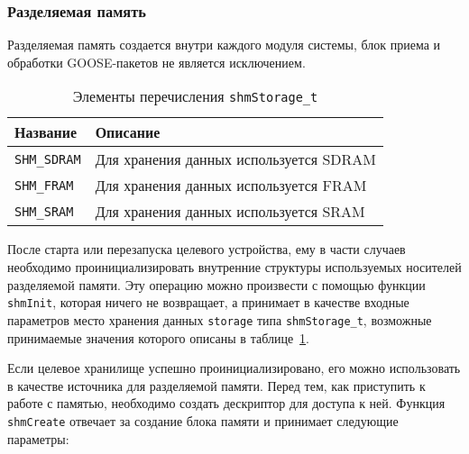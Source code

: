 \subsubsection{Разделяемая память}

Разделяемая память создается внутри каждого модуля системы, блок приема и обработки GOOSE-пакетов не является исключением.

\begin{table}[ht]
    \caption{Элементы перечисления \lstinline{shmStorage_t}}
    \label{table:func:shmStorages}
    \begin{tabular}{| >{\raggedright}m{}
                    | >{\raggedright\arraybackslash}m{}|}
        \hline
        \centering Название & \centering\arraybackslash Описание \\

        \hline
        \lstinline[]$SHM_SDRAM$ &
        Для хранения данных используется SDRAM
        \\

        \hline
        \lstinline[]$SHM_FRAM$ &
        Для хранения данных используется FRAM
        \\

        \hline
        \lstinline[]$SHM_SRAM$ &
        Для хранения данных используется SRAM
        \\

        \hline
    \end{tabular}
\end{table}

После старта или перезапуска целевого устройства, ему в части случаев необходимо
проинициализировать внутренние структуры используемых носителей разделяемой памяти.
Эту операцию можно произвести с помощью функции \lstinline{shmInit}, которая ничего
не возвращает, а принимает в качестве входные параметров место хранения данных
\lstinline{storage} типа \lstinline{shmStorage_t}, возможные принимаемые значения
которого описаны в таблице~\ref{table:func:shmStorages}.


Если целевое хранилище успешно проинициализировано, его можно использовать
в качестве источника для разделяемой памяти.
Перед тем, как приступить к работе с памятью, необходимо создать дескриптор для доступа к ней. Функция \lstinline{shmCreate} отвечает за создание блока памяти и принимает следующие параметры:


